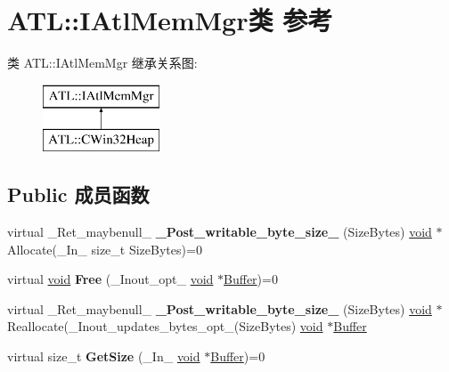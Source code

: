 \hypertarget{class_a_t_l_1_1_i_atl_mem_mgr}{}\section{A\+TL\+:\+:I\+Atl\+Mem\+Mgr类 参考}
\label{class_a_t_l_1_1_i_atl_mem_mgr}
类 A\+TL\+:\+:I\+Atl\+Mem\+Mgr 继承关系图\+:\begin{figure}[H]
\begin{center}
\leavevmode
\includegraphics[height=2.000000cm]{class_a_t_l_1_1_i_atl_mem_mgr}
\end{center}
\end{figure}
\subsection*{Public 成员函数}
\begin{DoxyCompactItemize}
\item 
\mbox{\label{class_a_t_l_1_1_i_atl_mem_mgr_a62f3e86d3793fefd0850e729c50a75aa}} 
virtual \+\_\+\+Ret\+\_\+maybenull\+\_\+ {\bfseries \+\_\+\+Post\+\_\+writable\+\_\+byte\+\_\+size\+\_\+} (Size\+Bytes) \hyperlink{interfacevoid}{void} $\ast$Allocate(\+\_\+\+In\+\_\+ size\+\_\+t Size\+Bytes)=0
\item 
\mbox{\label{class_a_t_l_1_1_i_atl_mem_mgr_ae6127fad057b115d1cd196719466e684}} 
virtual \hyperlink{interfacevoid}{void} {\bfseries Free} (\+\_\+\+Inout\+\_\+opt\+\_\+ \hyperlink{interfacevoid}{void} $\ast$\hyperlink{class_buffer}{Buffer})=0
\item 
\mbox{\label{class_a_t_l_1_1_i_atl_mem_mgr_af192e116f7c21b2097992601ea43b770}} 
virtual \+\_\+\+Ret\+\_\+maybenull\+\_\+ {\bfseries \+\_\+\+Post\+\_\+writable\+\_\+byte\+\_\+size\+\_\+} (Size\+Bytes) \hyperlink{interfacevoid}{void} $\ast$Reallocate(\+\_\+\+Inout\+\_\+updates\+\_\+bytes\+\_\+opt\+\_\+(Size\+Bytes) \hyperlink{interfacevoid}{void} $\ast$\hyperlink{class_buffer}{Buffer}
\item 
\mbox{\label{class_a_t_l_1_1_i_atl_mem_mgr_a14ff31476544925daaf23e7a97df69e1}} 
virtual size\+\_\+t {\bfseries Get\+Size} (\+\_\+\+In\+\_\+ \hyperlink{interfacevoid}{void} $\ast$\hyperlink{class_buffer}{Buffer})=0
\end{DoxyCompactItemize}

